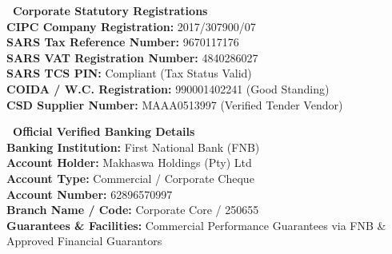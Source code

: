 \noindent
\begin{minipage}[t]{0.485\textwidth}
    \begin{tcolorbox}[enhanced, colback=white, colframe=mhlightgray, boxrule=0.8pt, arc=4pt, left=8pt, right=8pt, top=7pt, bottom=7pt, drop shadow=black!3]
        {\fontsize{8.5pt}{11pt}\selectfont\bfseries\color{mhnavy}\faFileContract\ Corporate Statutory Registrations}\\[3pt]
        {\fontsize{7.8pt}{11.0pt}\selectfont\color{mhtext}
        \textbf{CIPC Company Registration:} 2017/307900/07\\
        \textbf{SARS Tax Reference Number:} 9670117176\\
        \textbf{SARS VAT Registration Number:} 4840286027\\
        \textbf{SARS TCS PIN:} Compliant (Tax Status Valid)\\
        \textbf{COIDA / W.C. Registration:} 990001402241 (Good Standing)\\
        \textbf{CSD Supplier Number:} MAAA0513997 (Verified Tender Vendor)
        }
    \end{tcolorbox}
\end{minipage}
\hfill
\begin{minipage}[t]{0.485\textwidth}
    \begin{tcolorbox}[enhanced, colback=white, colframe=mhlightgray, boxrule=0.8pt, arc=4pt, left=8pt, right=8pt, top=7pt, bottom=7pt, drop shadow=black!3]
        {\fontsize{8.5pt}{11pt}\selectfont\bfseries\color{mhnavy}\faUniversity\ Official Verified Banking Details}\\[3pt]
        {\fontsize{7.8pt}{11.0pt}\selectfont\color{mhtext}
        \textbf{Banking Institution:} First National Bank (FNB)\\
        \textbf{Account Holder:} Makhaswa Holdings (Pty) Ltd\\
        \textbf{Account Type:} Commercial / Corporate Cheque\\
        \textbf{Account Number:} 62896570997\\
        \textbf{Branch Name / Code:} Corporate Core / 250655\\
        \textbf{Guarantees \& Facilities:} Commercial Performance Guarantees via FNB \& Approved Financial Guarantors
        }
    \end{tcolorbox}
\end{minipage}

\vfill


